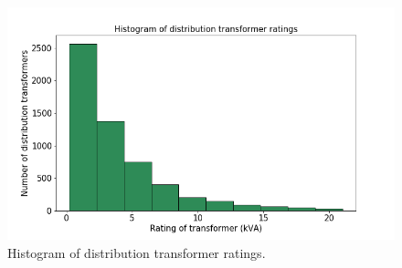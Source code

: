 \documentclass[11pt,letterpaper]{article}
\begin{document}
\begin{figure}[h]
	\centering
	\includegraphics[width=\textwidth]{rating_dist}
	\caption{Histogram of distribution transformer ratings.}
	\label{fig:rating-method-1}
\end{figure}
\end{document}

